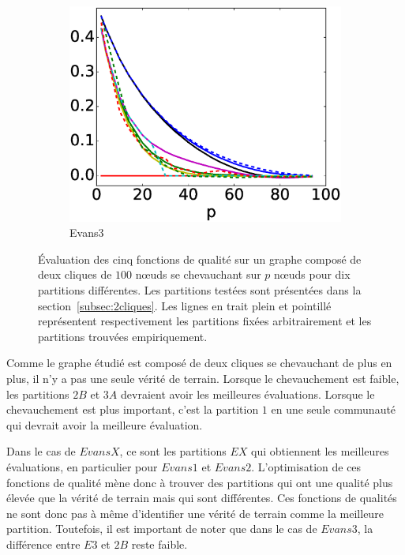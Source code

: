 \begin{figure}[h]
\begin{subfigure}{0.31\textwidth}
		\includegraphics[width=\linewidth]{img/ExpectedNodes/2Cliques/2Clique_Evans3.eps}
		\caption{\label{fig:2CE3}Evans3}		
	\end{subfigure}
	\caption{\'Evaluation des cinq fonctions de qualité sur un graphe composé de deux cliques de $100$ n\oe{}uds se chevauchant sur $p$ n\oe{}uds pour dix partitions différentes.
	Les partitions testées sont présentées dans la section~\ref{subsec:2cliques}.
	Les lignes en trait plein et pointillé représentent respectivement les partitions fixées arbitrairement et les partitions trouvées empiriquement.}
	\label{fig:2Cres}
\end{figure}

Comme le graphe étudié est composé de deux cliques se chevauchant de plus en plus, il n'y a pas une seule vérité de terrain.
Lorsque le chevauchement est faible, les partitions $2B$ et $3A$ devraient avoir les meilleures évaluations.
Lorsque le chevauchement est plus important, c'est la partition $1$ en une seule communauté qui devrait avoir la meilleure évaluation.

Dans le cas de $EvansX$, ce sont les partitions $EX$ qui obtiennent les meilleures évaluations, en particulier pour $Evans1$ et $Evans2$.
L'optimisation de ces fonctions de qualité mène donc à trouver des partitions qui ont une qualité plus élevée que la vérité de terrain mais qui sont différentes.
Ces fonctions de qualités ne sont donc pas à même d'identifier une vérité de terrain comme la meilleure partition.
Toutefois, il est important de noter que dans le cas de $Evans3$, la différence entre $E3$ et $2B$ reste faible.

